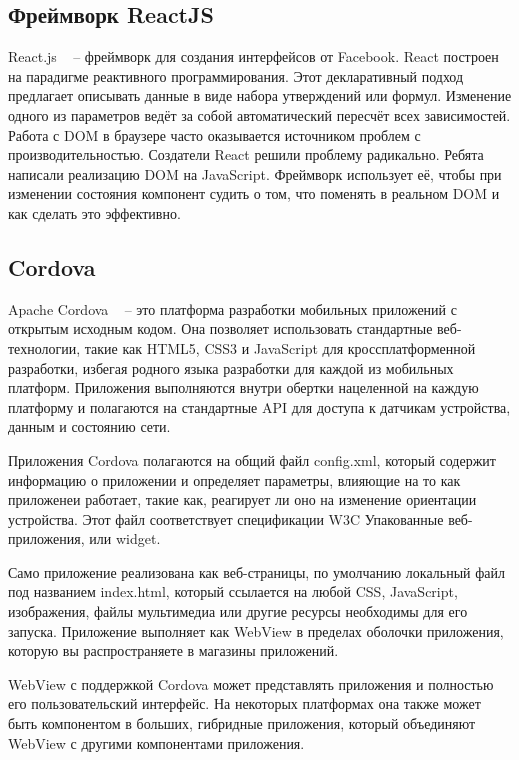 
\subsection{Фреймворк ReactJS}
\label{sub:domain:other_algos}
React.js ~\cite{react_js} -- фреймворк для создания интерфейсов от Facebook. React построен на парадигме реактивного программирования. Этот декларативный подход предлагает описывать данные в виде набора утверждений или формул. Изменение одного из параметров ведёт за собой автоматический пересчёт всех зависимостей. Работа с DOM в браузере часто оказывается источником проблем с производительностью. Создатели React решили проблему радикально. Ребята написали реализацию DOM на JavaScript. Фреймворк использует её, чтобы при изменении состояния компонент судить о том, что поменять в реальном DOM и как сделать это эффективно.

\subsection{Cordova}
\label{sub:domain:other_algos2}
Apache Cordova ~\cite{cordova} -- это платформа разработки мобильных приложений с открытым исходным кодом. Она позволяет использовать стандартные веб-технологии, такие как HTML5, CSS3 и JavaScript для кроссплатформенной разработки, избегая родного языка разработки для каждой из мобильных платформ. Приложения выполняются внутри обертки нацеленной на каждую платформу и полагаются на стандартные API для доступа к датчикам устройства, данным и состоянию сети.

Приложения Cordova полагаются на общий файл config.xml, который содержит информацию о приложении и определяет параметры, влияющие на то как приложенеи работает, такие как, реагирует ли оно на изменение ориентации устройства. Этот файл соответствует спецификации W3C Упакованные веб-приложения, или widget.

Само приложение реализована как веб-страницы, по умолчанию локальный файл под названием index.html, который ссылается на любой CSS, JavaScript, изображения, файлы мультимедиа или другие ресурсы необходимы для его запуска. Приложение выполняет как WebView в пределах оболочки приложения, которую вы распространяете в магазины приложений.

WebView с поддержкой Cordova может представлять приложения и полностью его пользовательский интерфейс. На некоторых платформах она также может быть компонентом в больших, гибридные приложения, который объединяют WebView с другими компонентами приложения.

